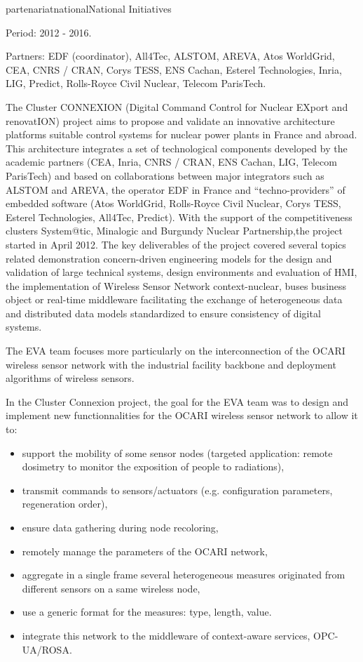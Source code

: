 \documentclass{ra2016}
\begin{document}
\begin{module}{partenariat}{national}{National Initiatives}
\begin{participants}
\end{participants}

Period: 2012 - 2016.

Partners: EDF (coordinator), All4Tec, ALSTOM, AREVA, Atos WorldGrid, CEA, CNRS / CRAN, Corys TESS, ENS Cachan, Esterel Technologies, Inria, LIG, Predict, Rolls-Royce Civil Nuclear, Telecom ParisTech.

The Cluster CONNEXION (Digital Command Control for Nuclear EXport and renovatION) project aims to propose and validate an innovative architecture platforms suitable control systems for nuclear power plants in France and abroad. This architecture integrates a set of technological components developed by the academic partners (CEA, Inria, CNRS / CRAN, ENS Cachan, LIG, Telecom ParisTech) and based on collaborations between major integrators such as ALSTOM and AREVA, the operator EDF in France and ``techno-providers'' of embedded software (Atos WorldGrid, Rolls-Royce Civil Nuclear, Corys TESS, Esterel Technologies, All4Tec, Predict).
With the support of the competitiveness clusters System@tic, Minalogic and Burgundy Nuclear Partnership,the project started in April 2012. The key deliverables of the project covered several topics related demonstration concern-driven engineering models for the design and validation of large technical systems, design environments and evaluation of HMI, the implementation of Wireless Sensor Network context-nuclear, buses business object or real-time middleware facilitating the exchange of heterogeneous data and distributed data models standardized to ensure consistency of digital systems. 

The EVA team focuses more particularly on the interconnection of the OCARI wireless sensor network with the industrial facility backbone and deployment algorithms of wireless sensors.


In the Cluster Connexion project, the goal for the EVA team was to design and implement new functionnalities for the OCARI wireless sensor network to allow it to:
\begin{itemize}
\item	support the mobility of some sensor nodes (targeted application: remote dosimetry to monitor the exposition of people to radiations), 
\item	transmit commands to sensors/actuators (e.g. configuration parameters, regeneration order),
\item	ensure data gathering during node recoloring,  
\item	remotely manage the parameters of the OCARI network,
\item	aggregate in a single frame several heterogeneous measures originated from different sensors on a same wireless node, 
\item	use a generic format for the measures: type, length, value.
\item integrate this network to the middleware of context-aware services, OPC-UA/ROSA. 
\end{itemize}


\end{module}
\end{document}
